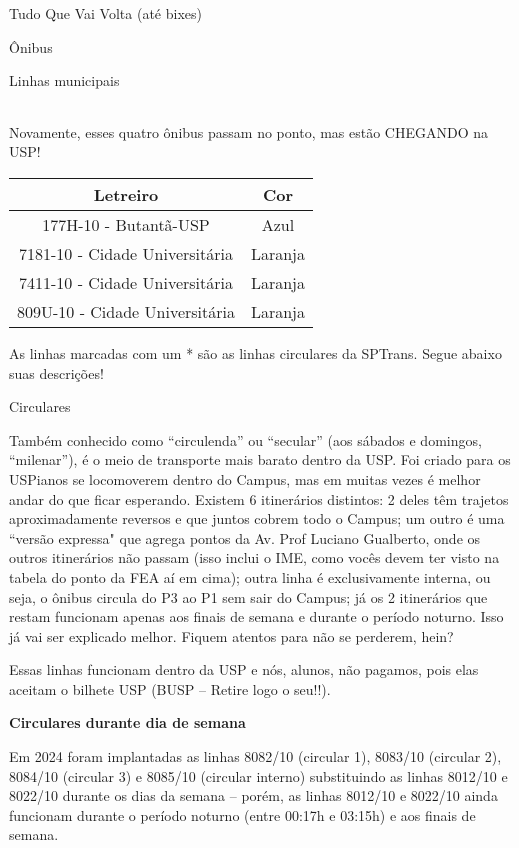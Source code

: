 \begin{secao}{Tudo Que Vai Volta (até bixes)}
\begin{subsecao}{Ônibus}
\begin{subsubsecao}{Linhas municipais}
\begin{center}
\begin{tabular}{|c|c|c|}
      \hline
	\end{tabular}
\end{center}

Novamente, esses quatro ônibus passam no ponto, mas estão CHEGANDO na USP!
\begin{center}
	\begin{tabular}{|c|c|}
	  \hline
	  Letreiro & Cor\\
	  \hline
	  177H-10 - Butantã-USP & Azul\\
	  7181-10 - Cidade Universitária & Laranja\\
	  7411-10 - Cidade Universitária & Laranja\\
	  809U-10 - Cidade Universitária & Laranja\\
	  \hline
	\end{tabular}
\end{center}

As linhas marcadas com um * são as linhas circulares da SPTrans.
Segue abaixo suas descrições!

\end{subsubsecao}

\begin{subsubsecao}{Circulares}

Também conhecido como ``circulenda'' ou ``secular'' (aos sábados e domingos,
``milenar''), é o meio de transporte mais barato dentro da USP. Foi criado para
os USPianos se locomoverem dentro do Campus, mas em muitas vezes é melhor andar
do que ficar esperando. Existem 6 itinerários distintos: 2 deles têm trajetos
aproximadamente reversos e que juntos cobrem todo o Campus; um outro é uma
``versão expressa" que agrega pontos da Av. Prof Luciano Gualberto, onde os outros
itinerários não passam (isso inclui o IME, como vocês devem ter visto na
tabela do ponto da FEA aí em cima); outra linha é exclusivamente interna, ou seja,
o ônibus circula do P3 ao P1 sem sair do Campus; já os 2 itinerários que restam 
funcionam apenas aos finais de semana e durante o período noturno. Isso já vai ser 
explicado melhor. Fiquem atentos para não se perderem, hein?

Essas linhas funcionam dentro da USP e nós, alunos, não pagamos, pois elas aceitam o 
bilhete USP (BUSP -- Retire logo o seu!!).

{\bf Circulares durante dia de semana}

Em 2024 foram implantadas as linhas 8082/10 (circular 1), 8083/10 (circular 2), 
8084/10 (circular 3) e 8085/10 (circular interno) substituindo as linhas 8012/10 e 
8022/10 durante os dias da semana -- porém, as linhas 8012/10 e 8022/10 ainda funcionam 
durante o período noturno (entre 00:17h e 03:15h) e aos finais de semana. 


\end{subsubsecao}
\end{subsecao}
\end{secao}
